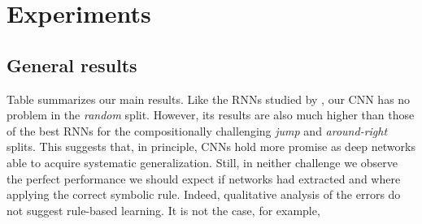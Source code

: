 \section{Experiments}
\label{sec:experiments}





\subsection{General results}


Table  summarizes our main results. Like the RNNs studied by
, our CNN has no problem in the
\emph{random} split. However, its results are also much higher than
those of the best RNNs for the compositionally challenging \emph{jump}
and \emph{around-right} splits. This suggests that, in principle, CNNs
hold more promise as deep networks able to acquire systematic
generalization. Still, in neither challenge we observe the perfect
performance we should expect if networks had extracted and where
applying the correct symbolic rule. Indeed, qualitative analysis of
the errors do not suggest rule-based learning. It is not the case, for
example, 

